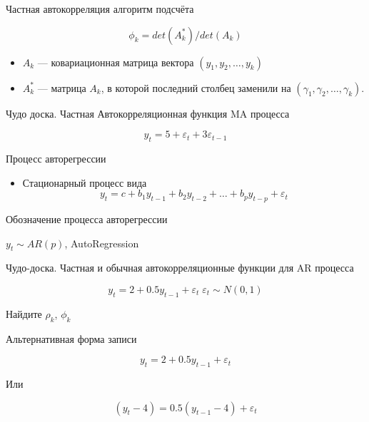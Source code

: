 \documentclass[ignorenonframetext,]{beamer}
\begin{document}
\begin{frame}{Частная автокорреляция алгоритм подсчёта}

\[
\phi_k = det(A_k^*)/det(A_k)
\]

\begin{itemize}
\item
  $A_k$ --- ковариационная матрица вектора $(y_1, y_2, \ldots, y_k)$
\item
  $A_k^*$ --- матрица $A_k$, в которой последний столбец заменили на
  $(\gamma_1, \gamma_2, \ldots, \gamma_k)$.
\end{itemize}

\end{frame}

\begin{frame}{Чудо доска. Частная Автокорреляционная функция MA
процесса}

\[
y_t = 5 + \varepsilon_t + 3 \varepsilon_{t-1}
\]

\end{frame}

\begin{frame}{Процесс авторегрессии}

\begin{itemize}
\itemsep1pt\parskip0pt
\item
  Стационарный процесс вида \[
  y_t=c + b_1 y_{t-1} + b_2 y_{t-2} + \ldots + b_p y_{t-p} + \varepsilon_t
  \]
\end{itemize}

\end{frame}

\begin{frame}{Обозначение процесса авторегрессии}

$y_t \sim AR(p)$, AutoRegression

\end{frame}

\begin{frame}{Чудо-доска. Частная и обычная автокорреляционные функции
для AR процесса}

\[
y_t = 2 + 0.5 y_{t-1} + \varepsilon_t \; \varepsilon_t \sim N(0,1)
\]

Найдите $\rho_k$, $\phi_k$

\end{frame}

\begin{frame}{Альтернативная форма записи}

\[
y_t = 2 + 0.5 y_{t-1} + \varepsilon_t
\]

Или

\[
(y_t - 4) = 0.5 (y_{t-1} - 4) + \varepsilon_t
\]

\end{frame}
\end{document}
